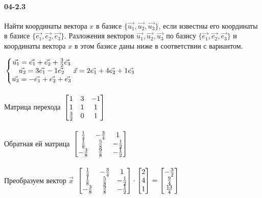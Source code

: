 \documentclass[12pt]{article}
\begin{document}

	\clearpage
	\paragraph{04-2.3} Найти координаты вектора \ensuremath{x} в базисе \ensuremath{\{\vec{u_{1}}, \vec{u_{2}}, \vec{u_{3}}\}}, если известны его координаты в базисе \ensuremath{\{\vec{e_{1}}, \vec{e_{2}}, \vec{e_{3}}\}}. Разложения векторов \ensuremath{ \vec{u_{1}}, \vec{u_{2}}, \vec{u_{3}} } по базису \ensuremath{\{\vec{e_{1}}, \vec{e_{2}}, \vec{e_{3}}\}} и координаты вектора \ensuremath{x} в этом базисе даны ниже в соответствии с вариантом.

	\ensuremath{
		\\
		\left\{\begin{matrix}
			\vec{u_{1}} = \vec{e_{1}} + \vec{e_{2}} + \frac{3}{2}\vec{e_{3}} \\
			\vec{u_{2}} = 3 \vec{e_{1}} - 1 \vec{e_{2}} \\
			\vec{u_{3}} = - \vec{e_{1}} + \vec{e_{2}} + \vec{e_{3}} \\
		\end{matrix}\right.
		\\\\
		\vec{x} = 2 \vec{e_{1}} + 4 \vec{e_{2}} + 1 \vec{e_{3}}
	}
	\\\\
	Матрица перехода
	\ensuremath{
		\\
		\begin{bmatrix}
			1 &	3 &	-1 \\
			1 &	1 &	1 \\
			\frac{3}{2} & 0 & 1
		\end{bmatrix}
	}
	\\\\
	Обратная ей матрица
	\ensuremath{
		\\
		\begin{bmatrix}
			\frac{1}{4} & -\frac{3}{4} & 1 \\
			\frac{1}{8} & \frac{5}{8} & -\frac{1}{2} \\
			-\frac{3}{8} & \frac{9}{8} & -\frac{1}{2}
		\end{bmatrix}
	}
	\\\\
	Преобразуем вектор \ensuremath{\vec{x}}
	\ensuremath{
		\\
		\begin{bmatrix}
			\frac{1}{4} & -\frac{3}{4} & 1 \\
			\frac{1}{8} & \frac{5}{8} & -\frac{1}{2} \\
			-\frac{3}{8} & \frac{9}{8} & -\frac{1}{2}
		\end{bmatrix}
		\cdot
		\begin{bmatrix}
			2 \\ 4 \\ 1
		\end{bmatrix}
		=
		\begin{bmatrix}
			-\frac{3}{2} \\ \frac{9}{4} \\ \frac{13}{4}
		\end{bmatrix}
	}
\end{document}
